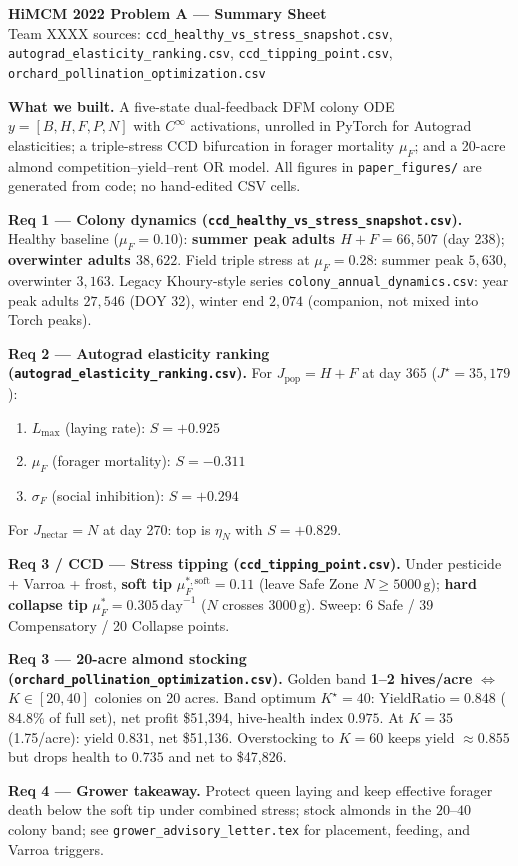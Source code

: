 \documentclass[11pt]{article}
\begin{document}
\begin{center}
{\Large\bfseries HiMCM 2022 Problem A --- Summary Sheet}\\[0.2em]
{\small Team XXXX \quad sources:
\texttt{ccd\_healthy\_vs\_stress\_snapshot.csv},
\texttt{autograd\_elasticity\_ranking.csv},
\texttt{ccd\_tipping\_point.csv},
\texttt{orchard\_pollination\_optimization.csv}}
\end{center}
\vspace{0.35em}

\noindent\textbf{What we built.}
A five-state dual-feedback DFM colony ODE
\(y=[B,H,F,P,N]\) with \(C^\infty\) activations, unrolled in PyTorch for
Autograd elasticities; a triple-stress CCD bifurcation in forager
mortality \(\mu_F\); and a 20-acre almond competition--yield--rent OR
model. All figures in \texttt{paper\_figures/} are generated from code;
no hand-edited CSV cells.

\medskip
\noindent\textbf{Req 1 --- Colony dynamics
(\texttt{ccd\_healthy\_vs\_stress\_snapshot.csv}).}
Healthy baseline (\(\mu_F=0.10\)):
\textbf{summer peak adults \(H+F=66{,}507\)} (day 238);
\textbf{overwinter adults \(38{,}622\)}.
Field triple stress at \(\mu_F=0.28\): summer peak \(5{,}630\),
overwinter \(3{,}163\).
Legacy Khoury-style series
\texttt{colony\_annual\_dynamics.csv}: year peak adults \(27{,}546\)
(DOY 32), winter end \(2{,}074\) (companion, not mixed into Torch peaks).

\medskip
\noindent\textbf{Req 2 --- Autograd elasticity ranking
(\texttt{autograd\_elasticity\_ranking.csv}).}
For \(J_{\mathrm{pop}}=H+F\) at day 365 (\(J^\star=35{,}179\)):
\begin{enumerate}
\item \(L_{\max}\) (laying rate): \(S=+0.925\)
\item \(\mu_F\) (forager mortality): \(S=-0.311\)
\item \(\sigma_F\) (social inhibition): \(S=+0.294\)
\end{enumerate}
For \(J_{\mathrm{nectar}}=N\) at day 270: top is
\(\eta_N\) with \(S=+0.829\).

\medskip
\noindent\textbf{Req 3 / CCD --- Stress tipping
(\texttt{ccd\_tipping\_point.csv}).}
Under pesticide + Varroa + frost,
\textbf{soft tip} \(\mu_F^{\ast,\mathrm{soft}}=0.11\) (leave Safe Zone
\(N\ge 5000\,\mathrm{g}\));
\textbf{hard collapse tip}
\(\mu_F^{\ast}=0.305\,\mathrm{day}^{-1}\)
(\(N\) crosses \(3000\,\mathrm{g}\)).
Sweep: 6 Safe / 39 Compensatory / 20 Collapse points.

\medskip
\noindent\textbf{Req 3 --- 20-acre almond stocking
(\texttt{orchard\_pollination\_optimization.csv}).}
Golden band \textbf{1--2 hives/acre} \(\Leftrightarrow\)
\textbf{\(K\in[20,40]\)} colonies on 20 acres.
Band optimum \(K^\star=40\):
\(\mathrm{YieldRatio}=\mathbf{0.848}\) (\(84.8\%\) of full set),
net profit \$51{,}394, hive-health index \(0.975\).
At \(K=35\) (1.75/acre): yield \(0.831\), net \$51{,}136.
Overstocking to \(K=60\) keeps yield \(\approx 0.855\) but drops health
to \(0.735\) and net to \$47{,}826.

\medskip
\noindent\textbf{Req 4 --- Grower takeaway.}
Protect queen laying and keep effective forager death below the soft tip
under combined stress; stock almonds in the \(20\)--\(40\) colony band;
see \texttt{grower\_advisory\_letter.tex} for placement, feeding, and
Varroa triggers.
\end{document}
